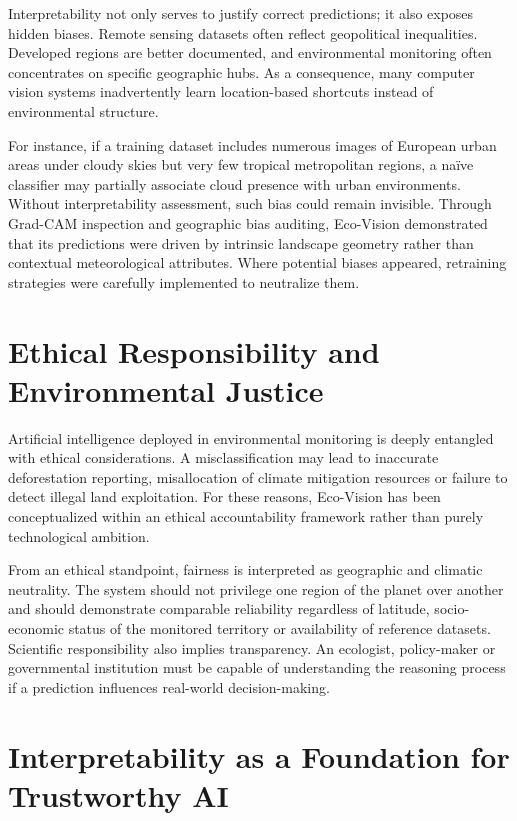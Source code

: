 \documentclass[12pt,a4paper]{report}
\begin{document}
Interpretability not only serves to justify correct predictions; it also exposes hidden biases. Remote sensing datasets often reflect geopolitical inequalities. Developed regions are better documented, and environmental monitoring often concentrates on specific geographic hubs. As a consequence, many computer vision systems inadvertently learn location-based shortcuts instead of environmental structure.

For instance, if a training dataset includes numerous images of European urban areas under cloudy skies but very few tropical metropolitan regions, a naïve classifier may partially associate cloud presence with urban environments. Without interpretability assessment, such bias could remain invisible. Through Grad-CAM inspection and geographic bias auditing, Eco-Vision demonstrated that its predictions were driven by intrinsic landscape geometry rather than contextual meteorological attributes. Where potential biases appeared, retraining strategies were carefully implemented to neutralize them.

\section{Ethical Responsibility and Environmental Justice}

Artificial intelligence deployed in environmental monitoring is deeply entangled with ethical considerations. A misclassification may lead to inaccurate deforestation reporting, misallocation of climate mitigation resources or failure to detect illegal land exploitation. For these reasons, Eco-Vision has been conceptualized within an ethical accountability framework rather than purely technological ambition.

From an ethical standpoint, fairness is interpreted as geographic and climatic neutrality. The system should not privilege one region of the planet over another and should demonstrate comparable reliability regardless of latitude, socio-economic status of the monitored territory or availability of reference datasets. Scientific responsibility also implies transparency. An ecologist, policy-maker or governmental institution must be capable of understanding the reasoning process if a prediction influences real-world decision-making.

\section{Interpretability as a Foundation for Trustworthy AI}
\end{document}
